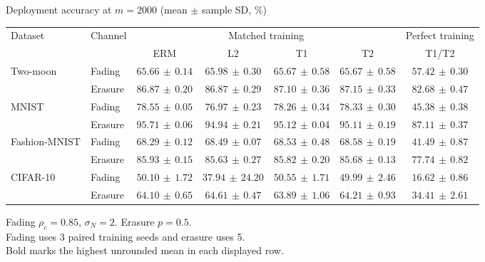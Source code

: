 \documentclass[border=4pt]{standalone}
\begin{document}
\begin{minipage}{7.8in}
\centering
Deployment accuracy at $m=2000$ (mean $\pm$ sample SD, \%)\\[4pt]
\begin{tabular*}{\linewidth}{@{\extracolsep{\fill}}llccccc@{}}
\toprule
\multirow{2}{*}{Dataset} & \multirow{2}{*}{Channel} & \multicolumn{4}{c}{Matched training} & Perfect training \\
\cmidrule(lr){3-6}\cmidrule(l){7-7}
 & & ERM & L2 & T1 & T2 & T1/T2 \\
\midrule
\multirow{2}{*}{Two-moon} & Fading & $65.66\,\pm\,0.14$ & $\mathbf{65.98}\,\pm\,0.30$ & $65.67\,\pm\,0.58$ & $65.67\,\pm\,0.58$ & $57.42\,\pm\,0.30$ \\
 & Erasure & $86.87\,\pm\,0.20$ & $86.87\,\pm\,0.29$ & $87.10\,\pm\,0.36$ & $\mathbf{87.15}\,\pm\,0.33$ & $82.68\,\pm\,0.47$ \\
\midrule[0.25pt]
\multirow{2}{*}{MNIST} & Fading & $\mathbf{78.55}\,\pm\,0.05$ & $76.97\,\pm\,0.23$ & $78.26\,\pm\,0.34$ & $78.33\,\pm\,0.30$ & $45.38\,\pm\,0.38$ \\
 & Erasure & $\mathbf{95.71}\,\pm\,0.06$ & $94.94\,\pm\,0.21$ & $95.12\,\pm\,0.04$ & $95.11\,\pm\,0.19$ & $87.11\,\pm\,0.37$ \\
\midrule[0.25pt]
\multirow{2}{*}{Fashion-MNIST} & Fading & $68.29\,\pm\,0.12$ & $68.49\,\pm\,0.07$ & $68.53\,\pm\,0.48$ & $\mathbf{68.58}\,\pm\,0.19$ & $41.49\,\pm\,0.87$ \\
 & Erasure & $\mathbf{85.93}\,\pm\,0.15$ & $85.63\,\pm\,0.27$ & $85.82\,\pm\,0.20$ & $85.68\,\pm\,0.13$ & $77.74\,\pm\,0.82$ \\
\midrule[0.25pt]
\multirow{2}{*}{CIFAR-10} & Fading & $50.10\,\pm\,1.72$ & $37.94\,\pm\,24.20$ & $\mathbf{50.55}\,\pm\,1.71$ & $49.99\,\pm\,2.46$ & $16.62\,\pm\,0.86$ \\
 & Erasure & $64.10\,\pm\,0.65$ & $\mathbf{64.61}\,\pm\,0.47$ & $63.89\,\pm\,1.06$ & $64.21\,\pm\,0.93$ & $34.41\,\pm\,2.61$ \\
\bottomrule
\end{tabular*}
\par\smallskip\raggedright\footnotesize
Fading $\rho_c=0.85$, $\sigma_N=2$. Erasure $p=0.5$.\\
Fading uses 3 paired training seeds and erasure uses 5.\\
Bold marks the highest unrounded mean in each displayed row.
\end{minipage}
\end{document}
